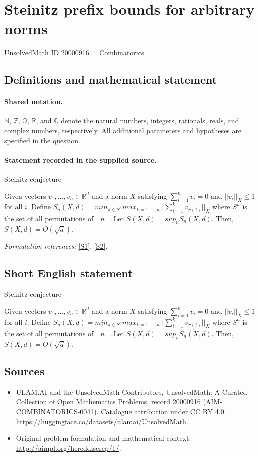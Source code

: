 \documentclass[11pt]{article}
\newcommand{\sref}[2]{\hyperlink{source:#1:#2}{[S#2]}}
\begin{document}
\setcounter{section}{20000915}
\section{Steinitz prefix bounds for arbitrary norms}\label{20000916}
{\small UnsolvedMath ID 20000916 · Combinatorics}
\subsection{Definitions and mathematical statement}

\paragraph{Shared notation.}$\mathbb N$, $\mathbb Z$, $\mathbb Q$, $\mathbb R$, and $\mathbb C$ denote the natural numbers, integers, rationals, reals, and complex numbers, respectively. All additional parameters and hypotheses are specified in the question.


\paragraph{Statement recorded in the supplied source.}
Steinitz conjecture

Given vectors $v_1,...,v_n\in\mathbb{R}^d$ and a norm $X$ satisfying $\sum_{i=1}^n v_i=0$ and $||v_i||_X\le 1$ for all $i$. Define $S_n(X,d)=min_{\pi\in S^n}max_{k=1,...,n}|| \sum_{i=1}^k v_{\pi(i)}||_X$ where $S^n$ is the set of all permutations of $[n]$. Let $S(X,d)=sup_n S_n(X,d)$. Then, $S(X,d) =O(\sqrt{d})$.
\par\smallskip\textit{Formulation references:} \sref{20000916}{1}, \sref{20000916}{2}.
\subsection{Short English statement}
Steinitz conjecture

Given vectors $v_1,...,v_n\in\mathbb{R}^d$ and a norm $X$ satisfying $\sum_{i=1}^n v_i=0$ and $||v_i||_X\le 1$ for all $i$. Define $S_n(X,d)=min_{\pi\in S^n}max_{k=1,...,n}|| \sum_{i=1}^k v_{\pi(i)}||_X$ where $S^n$ is the set of all permutations of $[n]$. Let $S(X,d)=sup_n S_n(X,d)$. Then, $S(X,d) =O(\sqrt{d})$.
\subsection{Sources}
\begin{itemize}
\item[\hypertarget{source:20000916:1}{S1}] ULAM.AI and the UnsolvedMath Contributors, UnsolvedMath: A Curated Collection of Open Mathematics Problems, record 20000916 (AIM-COMBINATORICS-0041). Catalogue attribution under CC BY 4.0.
\url{https://huggingface.co/datasets/ulamai/UnsolvedMath}.
\item[\hypertarget{source:20000916:2}{S2}] Original problem formulation and mathematical context.
\url{http://aimpl.org/hereddiscrep/1/}.
\end{itemize}
\label{end:20000916}
\end{document}

